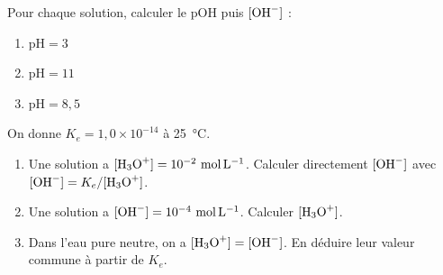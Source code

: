 \documentclass[11pt,a4paper]{article}
\begin{document}
\begin{exobox}[passer par la relation $\mathrm{pH}+\mathrm{pOH}=14$]
Pour chaque solution, calculer le $\mathrm{pOH}$ puis $[\ce{OH-}]$ :
\begin{enumerate}[label=\alph*),leftmargin=1.6em,itemsep=1pt]
  \item $\mathrm{pH} = 3$
  \item $\mathrm{pH} = 11$
  \item $\mathrm{pH} = 8{,}5$
\end{enumerate}
\end{exobox}

\begin{exobox}
On donne $K_e = 1{,}0\times10^{-14}$ à \SI{25}{\celsius}.
\begin{enumerate}[label=\alph*),leftmargin=1.6em,itemsep=1pt]
  \item Une solution a $[\ce{H3O+}] = 10^{-2}\ \si{mol.L^{-1}}$. Calculer directement $[\ce{OH-}]$ avec
        $[\ce{OH-}] = K_e/[\ce{H3O+}]$.
  \item Une solution a $[\ce{OH-}] = 10^{-4}\ \si{mol.L^{-1}}$. Calculer $[\ce{H3O+}]$.
  \item Dans l'eau pure neutre, on a $[\ce{H3O+}]=[\ce{OH-}]$. En déduire leur valeur commune à partir de $K_e$.
\end{enumerate}
\end{exobox}
\end{document}
